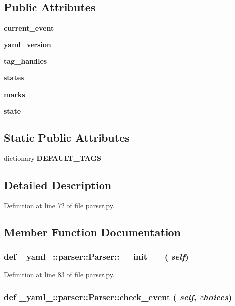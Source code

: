 \subsection*{Public Attributes}
\begin{CompactItemize}
\item 
{\bf current\_\-event}
\item 
{\bf yaml\_\-version}
\item 
{\bf tag\_\-handles}
\item 
{\bf states}
\item 
{\bf marks}
\item 
{\bf state}
\end{CompactItemize}
\subsection*{Static Public Attributes}
\begin{CompactItemize}
\item 
dictionary {\bf DEFAULT\_\-TAGS}
\end{CompactItemize}


\subsection{Detailed Description}


Definition at line 72 of file parser.py.

\subsection{Member Function Documentation}
\subsubsection{\setlength{\rightskip}{0pt plus 5cm}def \_\-yaml\_\-::parser::Parser::\_\-\_\-init\_\-\_\- ( {\em self})}\label{class__yaml___1_1parser_1_1Parser_3182fc0509dd87d937b095948eed3e5e}




Definition at line 83 of file parser.py.
\subsubsection{\setlength{\rightskip}{0pt plus 5cm}def \_\-yaml\_\-::parser::Parser::check\_\-event ( {\em self},  {\em choices})}\label{class__yaml___1_1parser_1_1Parser_0c6a0f91006f91fc56a56918d8d60ec5}




